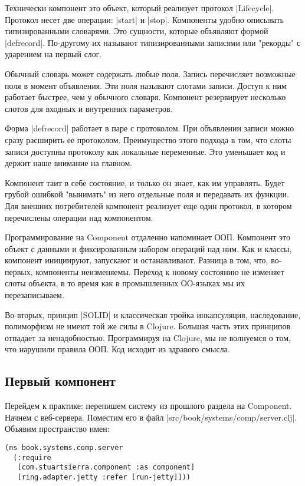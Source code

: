 Технически компонент это объект, который реализует протокол
\spverb|Lifecycle|. Протокол несет две операции: \spverb|start| и \spverb|stop|. Компоненты удобно
описывать типизированными словарями. Это сущности, которые объявляют формой
\spverb|defrecord|. По-другому их называют типизированными записями или "рекорды" с
ударением на первый слог.

Обычный словарь может содержать любые поля. Запись перечисляет возможные поля в
момент объявления. Эти поля называют слотами записи. Доступ к ним работает
быстрее, чем у обычного словаря. Компонент резервирует несколько слотов для
входных и внутренних параметров.

Форма \spverb|defrecord| работает в паре с протоколом. При объявлении записи можно
сразу расширить ее протоколом. Преимущество этого подхода в том, что слоты
записи доступны протоколу как локальные переменные. Это уменьшает код и держит
наше внимание на главном.

Компонент таит в себе состояние, и только он знает, как им управлять. Будет
грубой ошибкой "вынимать" из него отдельные поля и передавать их функции. Для
внешних потребителей компонент реализует еще один протокол, в котором
перечислены операции над компонентом.

Программирование на Component отдаленно напоминает ООП. Компонент это объект с
данными и фиксированным набором операций над ним. Как и классы, компонент
инициируют, запускают и останавливают. Разница в том, что, во-первых, компоненты
неизменяемы. Переход к новому состоянию не изменяет слоты объекта, в то время
как в промышленных ОО-языках мы их перезаписываем.

Во-вторых, принцип \spverb|SOLID| и классическая тройка инкапсуляция, наследование,
полиморфизм не имеют той же силы в Clojure. Большая часть этих принципов
отпадает за ненадобностью. Программируя на Clojure, мы не волнуемся о том, что
нарушили правила ООП. Код исходит из здравого смысла.

\subsection{Первый компонент}

Перейдем к практике: перепишем систему из прошлого раздела на Component. Начнем
с веб-сервера. Поместим его в файл \spverb|src/book/systems/comp/server.clj|. Объявим
пространство имен:

\begin{verbatim}
(ns book.systems.comp.server
  (:require
   [com.stuartsierra.component :as component]
   [ring.adapter.jetty :refer [run-jetty]]))
\end{verbatim}

